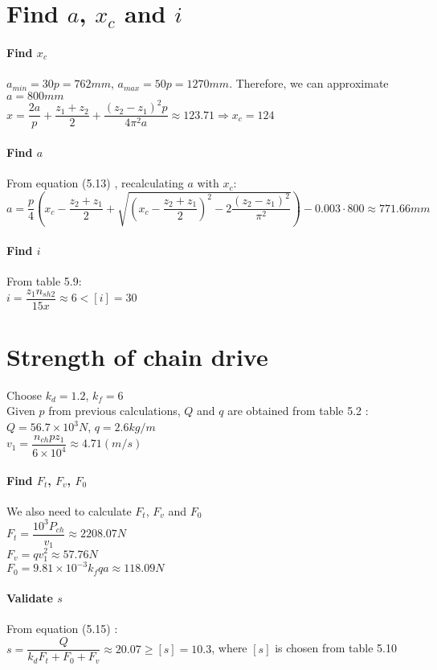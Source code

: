 \section{Find $ a $, $ x_c $ and $ i $}
\paragraph{Find $ x_c $}$ a_{min}=30p=762\unit{mm} $, $ a_{max} = 50p=1270\unit{mm}$. Therefore, we can approximate $ a=800\unit{mm} $\\
$ x = \dfrac{2a}{p} + \dfrac{z_1+z_2}{2} + \dfrac{(z_2-z_1)^2p}{4\pi^2a} \approx 123.71 \Rightarrow x_c = 124$
\paragraph{Find $ a $}From equation (5.13) , recalculating $ a $ with $ x_c $:\\
$ a = \dfrac{p}{4}\left(x_c-\dfrac{z_2+z_1}{2}+\sqrt{\left(x_c-\dfrac{z_2+z_1}{2}\right)^2-2\dfrac{(z_2-z_1)^2}{\pi^2}}\right) - 0.003\cdot800\approx 771.66\unit{mm}$
\paragraph{Find $ i $} From table 5.9:\\ $i=\dfrac{z_1n_{sh2}}{15x}\approx6<[i]=30 $
\section{Strength of chain drive}
Choose $ k_d = 1.2 $, $ k_f = 6 $\\
Given $ p $ from previous calculations, $ Q $ and $ q $ are obtained from table 5.2 :\\
$ Q = 56.7\times10^3\unit{N} $, $ q = 2.6\unit{kg/m} $ \\
$ v_1=\dfrac{n_{ch}pz_1}{6\times10^4}\approx4.71(m/s) $
\paragraph{Find $ F_t $, $ F_v $, $ F_0 $}We also need to calculate $ F_t $, $ F_v $ and $ F_0 $\\
$ F_t = \dfrac{10^3P_{ch}}{v_1} \approx 2208.07\unit{N}$\\
$ F_v=qv_1^2\approx57.76\unit{N} $\\
$ F_0=9.81\times10^{-3}k_fqa \approx118.09\unit{N}$
\paragraph{Validate $ s $}From equation (5.15) :\\ $ s = \dfrac{Q}{k_dF_t+F_0+F_v} \approx 20.07 \geq [s]=10.3$, where $ [s] $ is chosen from table 5.10 
